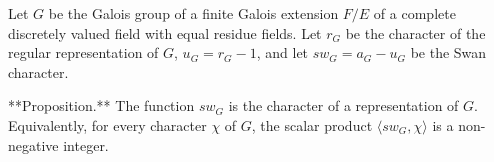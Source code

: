 Let $G$ be the Galois group of a finite Galois extension $F/E$ of a complete discretely valued field with equal residue fields. Let $r_G$ be the character of the regular representation of $G$, $u_G = r_G - 1$, and let $sw_G = a_G - u_G$ be the Swan character.

**Proposition.** The function $sw_G$ is the character of a representation of $G$. Equivalently, for every character $\chi$ of $G$, the scalar product $\langle sw_G, \chi \rangle$ is a non-negative integer.

